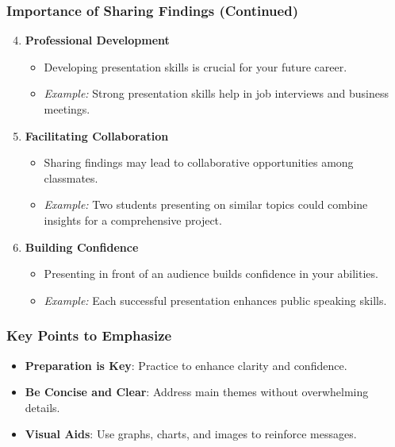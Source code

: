 \documentclass{beamer}
\begin{document}
\begin{frame}[fragile]
    \frametitle{Importance of Sharing Findings (Continued)}
    \begin{enumerate}
        \setcounter{enumi}{3} %
        \item \textbf{Professional Development}
            \begin{itemize}
                \item Developing presentation skills is crucial for your future career.
                \item \textit{Example:} Strong presentation skills help in job interviews and business meetings.
            \end{itemize}
        
        \item \textbf{Facilitating Collaboration}
            \begin{itemize}
                \item Sharing findings may lead to collaborative opportunities among classmates.
                \item \textit{Example:} Two students presenting on similar topics could combine insights for a comprehensive project.
            \end{itemize}

        \item \textbf{Building Confidence}
            \begin{itemize}
                \item Presenting in front of an audience builds confidence in your abilities.
                \item \textit{Example:} Each successful presentation enhances public speaking skills.
            \end{itemize}
    \end{enumerate}
\end{frame}

\begin{frame}[fragile]
    \frametitle{Key Points to Emphasize}
    \begin{itemize}
        \item \textbf{Preparation is Key}: Practice to enhance clarity and confidence.
        \item \textbf{Be Concise and Clear}: Address main themes without overwhelming details.
        \item \textbf{Visual Aids}: Use graphs, charts, and images to reinforce messages.
    \end{itemize}
\end{frame}
\end{document}
